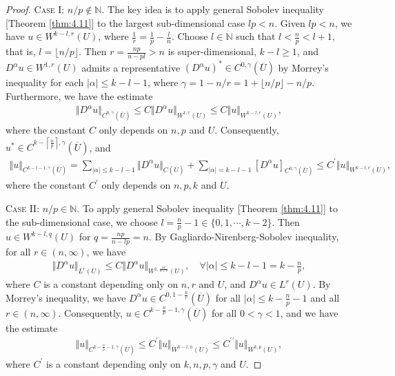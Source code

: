 \documentclass{article}
\numberwithin{equation}{section}
\newcommand{\bbN}{\mathbb{N}}
\newcommand{\ol}{\overline}
\theoremstyle{plain}
\theoremstyle{definition}
\begin{document}
\begin{proof}
\textsc{Case I: $n/p\notin\bbN$.} The key idea is to apply general Sobolev inequality [Theorem \ref{thm:4.11}] to the largest sub-dimensional case $lp<n$. Given $lp<n$, we have $u\in W^{k-l,r}(U)$, where $\frac{1}{r}=\frac{1}{p}-\frac{l}{n}$. Choose $l\in\bbN$ such that $l<\frac{n}{p}< l+1$, that is, $l=\lfloor n/p\rfloor$. Then $r=\frac{np}{n-pl}>n$ is super-dimensional, $k-l\geq 1$, and $D^\alpha u\in W^{1,r}(U)$ admits a representative $(D^\alpha u)^*\in C^{0,\gamma}(\ol{U})$ by Morrey's inequality for each $\vert\alpha\vert\leq k-l-1$, where $\gamma=1-n/r=1+\lfloor n/p\rfloor-n/p$. Furthermore, we have the estimate
\begin{align*}
	\Vert D^\alpha u\Vert_{C^{0,\gamma}(\ol{U})}\leq C\Vert D^\alpha u\Vert_{W^{1,r}(U)}\leq C\Vert u\Vert_{W^{k-l,r}(U)}, 
\end{align*}
where the constant $C$ only depends on $n,p$ and $U$. Consequently, $u^*\in C^{k-\left\lceil\frac{n}{p}\right\rceil,\gamma}(\ol{U})$, and
\begin{align*}
	\Vert u\Vert_{C^{k-l-1,\gamma}(\ol{U})}=\sum_{\vert\alpha\vert\leq k-l-1}\Vert D^\alpha u\Vert_{C(\ol{U})}+\sum_{\vert\alpha\vert=k-l-1}[D^\alpha u]_{C^{0,\gamma}(\ol{U})}\leq C^\prime\Vert u\Vert_{W^{k-l,r}(U)},
\end{align*}
where the constant $C^\prime$ only depends on $n,p,k$ and $U$.\vspace{0.15cm}

\textsc{Case II: $n/p\in\bbN$.} To apply general Sobolev inequality [Theorem \ref{thm:4.11}] to the sub-dimensional case, we choose $l=\frac{n}{p}-1\in\{0,1,\cdots,k-2\}$. Then $u\in W^{k-l,q}(U)$ for $q=\frac{np}{n-lp}=n$. By Gagliardo-Nirenberg-Sobolev inequality, for all $r\in(n,\infty)$, we have
\begin{align*}
	\Vert D^\alpha u\Vert_{L^r(U)}\leq C\Vert D^\alpha u\Vert_{W^{1,\frac{nr}{n+r}}(U)},\quad\forall\vert\alpha\vert\leq k-l-1=k-\frac{n}{p},
\end{align*}
where $C$ is a constant depending only on $n,r$ and $U$, and $D^\alpha u\in L^r(U)$. By Morrey's inequality, we have $D^\alpha u\in C^{0,1-\frac{n}{r}}(\ol{U})$ for all $\vert\alpha\vert\leq k- \frac{n}{p}-1$ and all $r\in(n,\infty)$. Consequently, $u\in C^{k-\frac{n}{p}-1,\gamma}(\ol{U})$ for all $0<\gamma<1$, and we have the estimate
\begin{align*}
	\Vert u\Vert_{C^{k-\frac{n}{p}-1,\gamma}(\ol{U})}\leq C^\prime\Vert u\Vert_{W^{k-l,n}(U)}\leq C^{\prime\prime}\Vert u\Vert_{W^{k,p}(U)},
\end{align*}
where $C^\prime$ is a constant depending only on $k,n,p,\gamma$ and $U$.
\end{proof}
\end{document}
